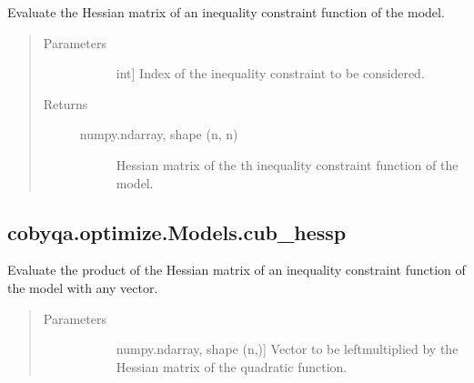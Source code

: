 \documentclass[letterpaper,10pt,english]{sphinxmanual}
\begin{document}
\begin{fulllineitems}
\begin{fulllineitems}
\label{\detokenize{refs/generated/cobyqa.optimize.Models.cub_hess:cobyqa.optimize.Models.cub_hess}}
\sphinxAtStartPar
Evaluate the Hessian matrix of an inequality constraint function of the
model.
\begin{quote}\begin{description}
\item[{Parameters}] \leavevmode\begin{description}
\item[{}] \leavevmode{[}int{]}
\sphinxAtStartPar
Index of the inequality constraint to be considered.

\end{description}

\item[{Returns}] \leavevmode\begin{description}
\item[{numpy.ndarray, shape (n, n)}] \leavevmode
\sphinxAtStartPar
Hessian matrix of the \sphinxhyphen{}th inequality constraint function of the
model.

\end{description}

\end{description}\end{quote}

\end{fulllineitems}



\subsection{cobyqa.optimize.Models.cub\_hessp}
\label{\detokenize{refs/generated/cobyqa.optimize.Models.cub_hessp:cobyqa-optimize-models-cub-hessp}}\label{\detokenize{refs/generated/cobyqa.optimize.Models.cub_hessp::doc}}

\begin{fulllineitems}
\label{\detokenize{refs/generated/cobyqa.optimize.Models.cub_hessp:cobyqa.optimize.Models.cub_hessp}}
\sphinxAtStartPar
Evaluate the product of the Hessian matrix of an inequality constraint
function of the model with any vector.
\begin{quote}\begin{description}
\item[{Parameters}] \leavevmode\begin{description}
\item[{}] \leavevmode{[}numpy.ndarray, shape (n,){]}
\sphinxAtStartPar
Vector to be left\sphinxhyphen{}multiplied by the Hessian matrix of the quadratic
function.


\end{description}
\end{description}
\end{quote}
\end{fulllineitems}
\end{fulllineitems}
\end{document}
